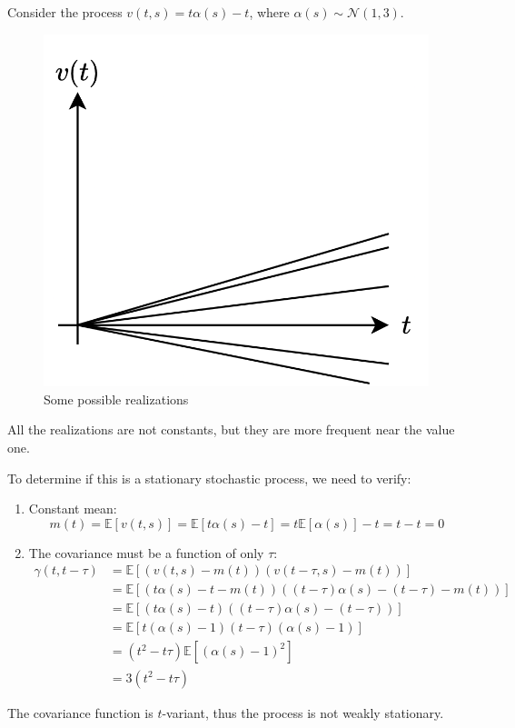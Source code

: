 \begin{example}
    Consider the process $v(t,s)=t\alpha(s)-t$, where $\alpha(s) \sim \mathcal{N}(1,3)$. 
    \begin{figure}[H]
        \centering
        \includegraphics[width=0.35\linewidth]{images/stationary.png}
        \caption{Some possible realizations}
    \end{figure}
    All the realizations are not constants, but they are more frequent near the value one.
    
    To determine if this is a stationary stochastic process, we need to verify: 
    \begin{enumerate}
        \item Constant mean: 
            \[m(t)=\mathbb{E}\left[v(t,s)\right]=\mathbb{E}\left[t\alpha(s)-t\right]= t\mathbb{E}\left[\alpha(s)\right]-t =t-t=0\]
        \item The covariance must be a function of only $\tau$: 
            \begin{align*}
                \gamma(t,t-\tau)&=\mathbb{E}\left[\left(v(t,s)-m(t)\right)\left(v(t-\tau,s)-m(t)\right)\right] \\
                                &=\mathbb{E}\left[\left(t\alpha(s)-t-m(t)\right)\left((t-\tau)\alpha(s)-(t-\tau)-m(t)\right)\right] \\
                                &=\mathbb{E}\left[\left(t\alpha(s)-t\right)\left((t-\tau)\alpha(s)-(t-\tau)\right)\right] \\
                                &=\mathbb{E}\left[t\left(\alpha(s)-1\right)(t-\tau)\left(\alpha(s)-1\right)\right] \\
                                &=(t^2-t\tau)\mathbb{E}\left[{\left(\alpha(s)-1\right)}^2\right] \\
                                &=3(t^2-t\tau)
            \end{align*}
    \end{enumerate}
    The covariance function is $t$-variant, thus the process is not weakly stationary.
\end{example}